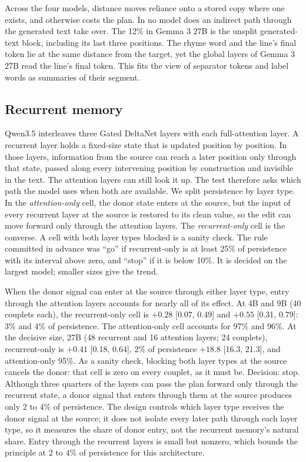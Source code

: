 \documentclass[
]{article}
\begin{document}
Across the four models, distance moves reliance onto a stored copy where
one exists, and otherwise costs the plan. In no model does an indirect
path through the generated text take over. The 12\% in Gemma 3 27B is
the unsplit generated-text block, including its last three positions.
The rhyme word and the line's final token lie at the same distance from
the target, yet the global layers of Gemma 3 27B read the line's final
token. This fits the view of separator tokens \citep{chen2024sepllm} and
label words \citep{wang2023labelwords} as summaries of their segment.

\subsection{Recurrent memory}\label{sec-app-recurrent}

Qwen3.5 \citep{qwen2026qwen35} interleaves three Gated DeltaNet layers
\citep{yang2025gateddeltanet} with each full-attention layer. A
recurrent layer holds a fixed-size state that is updated position by
position. In those layers, information from the source can reach a later
position only through that state, passed along every intervening
position by construction and invisible in the text. The attention layers
can still look it up. The test therefore asks which path the model uses
when both are available. We split persistence by layer type. In the
\emph{attention-only} cell, the donor state enters at the source, but
the input of every recurrent layer at the source is restored to its
clean value, so the edit can move forward only through the attention
layers. The \emph{recurrent-only} cell is the converse. A cell with both
layer types blocked is a sanity check. The rule committed in advance was
``go'' if recurrent-only is at least 25\% of persistence with its
interval above zero, and ``stop'' if it is below 10\%. It is decided on
the largest model; smaller sizes give the trend.

When the donor signal can enter at the source through either layer type,
entry through the attention layers accounts for nearly all of its
effect. At 4B and 9B (40 couplets each), the recurrent-only cell is
\(+0.28\) {[}0.07, 0.49{]} and \(+0.55\) {[}0.31, 0.79{]}: 3\% and 4\%
of persistence. The attention-only cell accounts for 97\% and 96\%. At
the decisive size, 27B (48 recurrent and 16 attention layers; 24
couplets), recurrent-only is \(+0.41\) {[}0.18, 0.64{]}, 2\% of
persistence \(+18.8\) {[}16.3, 21.3{]}, and attention-only 95\%. As a
sanity check, blocking both layer types at the source cancels the donor:
that cell is zero on every couplet, as it must be. Decision: stop.
Although three quarters of the layers can pass the plan forward only
through the recurrent state, a donor signal that enters through them at
the source produces only 2 to 4\% of persistence. The design controls
which layer type receives the donor signal at the source; it does not
isolate every later path through each layer type, so it measures the
share of donor entry, not the recurrent memory's natural share. Entry
through the recurrent layers is small but nonzero, which bounds the
principle at 2 to 4\% of persistence for this architecture.
\end{document}
